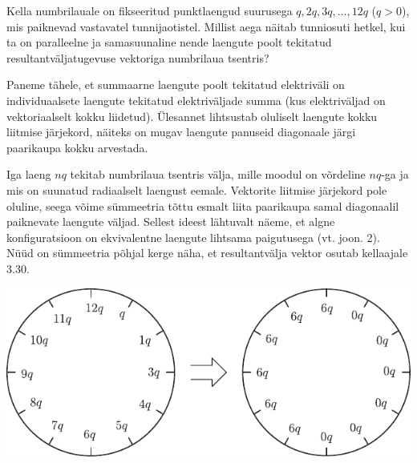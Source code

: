 
Kella numbrilauale on fikseeritud punktlaengud suurusega $q, 2q, 3q, \ldots, 12q$ ($q > 0$), mis paiknevad vastavatel tunnijaotistel. Millist aega näitab tunniosuti hetkel, kui ta on paralleelne ja samasuunaline nende laengute poolt tekitatud resultantväljatugevuse vektoriga numbrilaua tsentris?

\hint
Paneme tähele, et summaarne laengute poolt tekitatud elektriväli on individuaalsete laengute tekitatud elektriväljade summa (kus elektriväljad on vektoriaalselt kokku liidetud). Ülesannet lihtsustab oluliselt laengute kokku liitmise järjekord, näiteks on mugav laengute panuseid diagonaale järgi paarikaupa kokku arvestada.

\solu
Iga laeng $nq$ tekitab numbrilaua tsentris välja, mille moodul on võrdeline $nq$-ga ja mis on suunatud radiaalselt laengust eemale. Vektorite liitmise järjekord pole oluline, seega võime sümmeetria tõttu esmalt liita paarikaupa samal diagonaalil paiknevate laengute väljad. Sellest ideest lähtuvalt näeme, et algne konfiguratsioon on ekvivalentne laengute lihtsama paigutusega (vt. joon. 2). Nüüd on sümmeetria põhjal kerge näha, et resultantvälja vektor osutab kellaajale 3.30.
\begin{center}
	\includegraphics[width=0.7\linewidth]{2004-lahg-07-lah.pdf}
\end{center}

\probend